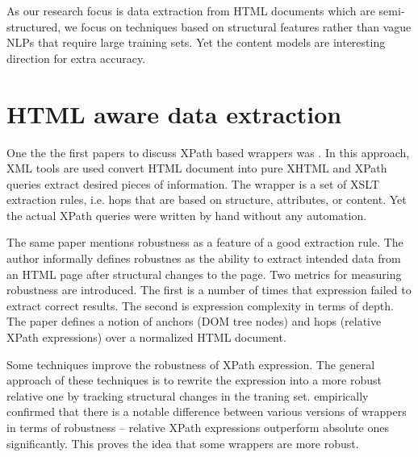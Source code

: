 As our research focus is data extraction from HTML documents which are semi-structured, we focus on techniques based on structural features rather than vague NLPs that require large training sets. Yet the content models are interesting direction for extra accuracy.


\section{HTML aware data extraction}

One the the first papers to discuss XPath based wrappers was \cite{Myllymaki02robustweb}. In this approach, XML tools are used convert HTML document into pure XHTML and XPath queries extract desired pieces of information. The wrapper is a set of XSLT extraction rules, i.e. hops that are based on structure, attributes, or content. Yet the actual XPath queries were written by hand without any automation.

The same paper mentions robustness as a feature of a good extraction rule. The author informally defines robustnes as the ability to extract intended data from an HTML page after structural changes to the page. Two metrics for measuring robustness are introduced. The first is a number of times that expression failed to extract correct results. The second is expression complexity in terms of depth. The paper defines a notion of anchors (DOM tree nodes) and hops (relative XPath expressions) over a normalized HTML document. 

Some techniques \cite{Chang:2006:SWI:1159162.1159300} improve the robustness of XPath expression. The general approach of these techniques is to rewrite the expression into a more robust relative one by tracking structural changes in the traning set. \cite{Kowalkiewicz:2006:RWC:1135777.1135928} empirically confirmed that there is a notable difference between various versions of wrappers in terms of robustness – relative XPath expressions outperform absolute ones significantly. This proves the idea that some wrappers are more robust.

